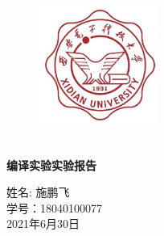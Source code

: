 \documentclass{article}
\begin{document}
\pagestyle{empty}
\begin{figure}
    \centering
    \includegraphics[width=0.35\textwidth]{xdu.jpeg}
\end{figure}

\begin{spacing}{3.0}
    \centering
    \ \\
    \textbf{\Huge 编译实验实验报告}

    \Large 姓名: 施鹏飞 \\ 学号：18040100077 \\ 2021年6月30日
\end{spacing}
\newpage 

\setcounter{secnumdepth}{4} 
\setcounter{tocdepth}{4}  
\begin{spacing}{2.0}
    \tableofcontents
\end{spacing}
\newpage
\end{document}
